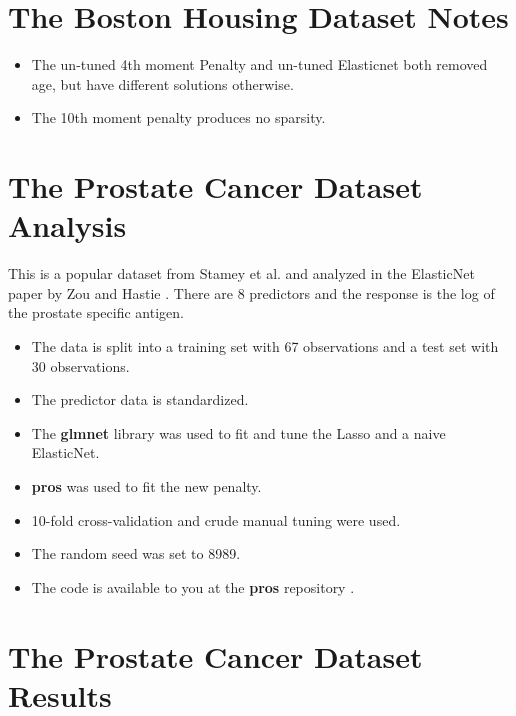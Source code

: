\documentclass[10pt, reqno]{article}
\numberwithin{equation}{section}
\begin{document}
\newpage
\section*{The Boston Housing Dataset Notes}

\begin{itemize}
\item The un-tuned 4th moment Penalty and un-tuned Elasticnet both removed age, but have different solutions otherwise.

\item The 10th moment penalty produces no sparsity.
\end{itemize}

\newpage
\section*{The Prostate Cancer Dataset Analysis}

This is a popular dataset from Stamey et al. \cite{prostate} and analyzed in the ElasticNet paper by Zou and Hastie \cite{elasticnet}.
There are 8 predictors and the response is the log of the prostate specific antigen.

\begin{itemize}
\item The data is split into a training set with 67 observations and a test set with 30 observations.

\item The predictor data is standardized.

\item The \textbf{glmnet} \cite{glmnet} library was used to fit and tune the Lasso and a naive ElasticNet.

\item \textbf{pros} \cite{pros} was used to fit the new penalty.

\item 10-fold cross-validation and crude manual tuning were used.

\item The random seed was set to 8989.

\item The code is available to you at the \textbf{pros} repository \cite{pros}.

\end{itemize}

\newpage
\section*{The Prostate Cancer Dataset Results}
\end{document}

